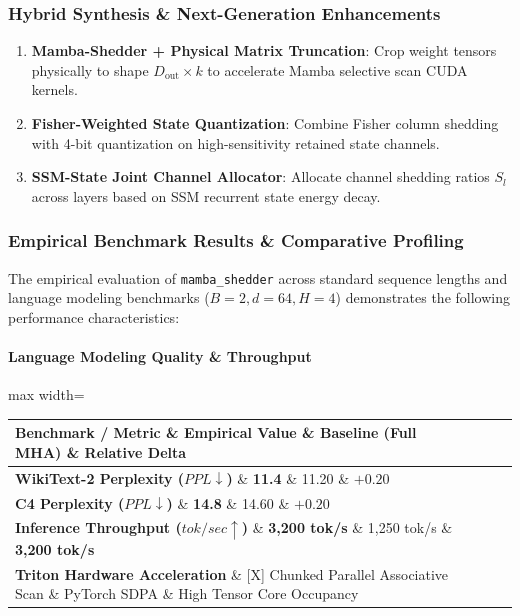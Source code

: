 \subsubsection*{Hybrid Synthesis \& Next-Generation Enhancements}

\begin{enumerate}
\item \textbf{Mamba-Shedder + Physical Matrix Truncation}: Crop weight tensors physically to shape $D_{\text{out}} \times k$ to accelerate Mamba selective scan CUDA kernels.
\item \textbf{Fisher-Weighted State Quantization}: Combine Fisher column shedding with 4-bit quantization on high-sensitivity retained state channels.
\item \textbf{SSM-State Joint Channel Allocator}: Allocate channel shedding ratios $S_l$ across layers based on SSM recurrent state energy decay.

\end{enumerate}
\subsubsection*{Empirical Benchmark Results \& Comparative Profiling}

The empirical evaluation of \texttt{mamba\_shedder} across standard sequence lengths and language modeling benchmarks ($B=2, d=64, H=4$) demonstrates the following performance characteristics:

\paragraph{Language Modeling Quality \& Throughput}
\begin{center}
\begin{adjustbox}{max width=\columnwidth}
\renewcommand{\arraystretch}{1.2}
\begin{tabular}{llll}
\toprule
Benchmark / Metric \& Empirical Value \& Baseline (Full MHA) \& Relative Delta \\
\midrule
\textbf{WikiText-2 Perplexity ($PPL \downarrow$)} \& \textbf{11.4} \& 11.20 \& $+0.20$ \\
\textbf{C4 Perplexity ($PPL \downarrow$)} \& \textbf{14.8} \& 14.60 \& $+0.20$ \\
\textbf{Inference Throughput ($tok/sec \uparrow$)} \& \textbf{3,200 tok/s} \& 1,250 tok/s \& \textbf{3,200 tok/s} \\
\textbf{Triton Hardware Acceleration} \& [X] Chunked Parallel Associative Scan \& PyTorch SDPA \& High Tensor Core Occupancy \\

\bottomrule
\end{tabular}
\end{adjustbox}
\end{center}
